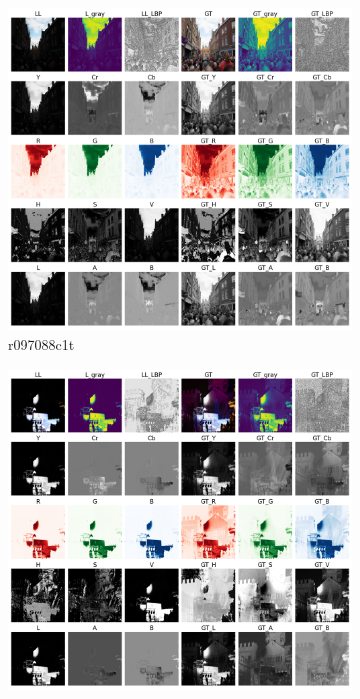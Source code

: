 \documentclass[a4paper]{ctexart}
\begin{document}
		\begin{figure}[htbp]
			\centering
			\begin{subfigure}{0.3\textwidth}
				\includegraphics[width=\linewidth]{picture/LLIE/Experiment/myplot_different_color_channels_r097088c1t}
				\captionsetup{font=scriptsize}
				\caption{r097088c1t}
				\label{fig: myplot_different_color_channels_r097088c1t}	
			\end{subfigure}
			\begin{subfigure}{0.3\textwidth}
				\includegraphics[width=\linewidth]{picture/LLIE/Experiment/myplot_different_color_channels_r141669e5t}

\end{subfigure}
\end{figure}
\end{document}

